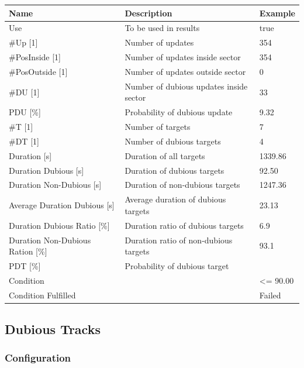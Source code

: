 \begin{center}
 \begin{table}[H]
  \begin{tabularx}{\textwidth}{ | l | X |  l | }
    \hline
    \textbf{Name} & \textbf{Description} & \textbf{Example} \\ \hline
    Use & To be used in results & true \\ \hline
    \#Up [1] & Number of updates & 354 \\ \hline
    \#PosInside [1] & Number of updates inside sector & 354 \\ \hline
    \#PosOutside [1] & Number of updates outside sector & 0 \\ \hline
    \#DU [1] & Number of dubious updates inside sector & 33 \\ \hline
    PDU [\%] & Probability of dubious update & 9.32 \\ \hline
    \#T [1] & Number of targets & 7 \\ \hline
    \#DT [1] & Number of dubious targets & 4 \\ \hline
    Duration [s] & Duration of all targets & 1339.86 \\ \hline
    Duration Dubious [s] & Duration of dubious targets & 92.50 \\ \hline
    Duration Non-Dubious [s] & Duration of non-dubious targets & 1247.36 \\ \hline
    Average Duration Dubious [s] & Average duration of dubious targets & 23.13 \\ \hline
    Duration Dubious Ratio [\%] & Duration ratio of dubious targets & 6.9 \\ \hline
    Duration Non-Dubious Ration [\%] & Duration ratio of non-dubious targets & 93.1 \\ \hline
    PDT [\%] & Probability of dubious target &  \\ \hline
    Condition &  & <= 90.00 \\ \hline
    Condition Fulfilled &  & Failed \\ \hline
\end{tabularx}
\end{table}
\end{center}

\subsection{Dubious Tracks}
\label{sec:eval_req_dubious_tracks} 

\subsubsection{Configuration}

